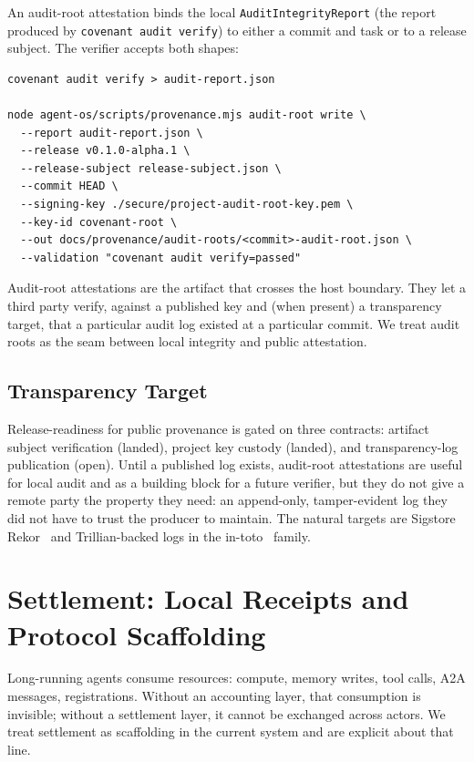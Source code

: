 \documentclass[11pt]{article}
\theoremstyle{plainsmall}
\begin{document}
An audit-root attestation binds the local \texttt{AuditIntegrityReport} (the report produced by \texttt{covenant audit verify}) to either a commit and task or to a release subject. The verifier accepts both shapes:

\begin{lstlisting}
covenant audit verify > audit-report.json

node agent-os/scripts/provenance.mjs audit-root write \
  --report audit-report.json \
  --release v0.1.0-alpha.1 \
  --release-subject release-subject.json \
  --commit HEAD \
  --signing-key ./secure/project-audit-root-key.pem \
  --key-id covenant-root \
  --out docs/provenance/audit-roots/<commit>-audit-root.json \
  --validation "covenant audit verify=passed"
\end{lstlisting}

Audit-root attestations are the artifact that crosses the host boundary. They let a third party verify, against a published key and (when present) a transparency target, that a particular audit log existed at a particular commit. We treat audit roots as the seam between local integrity and public attestation.

\subsection{Transparency Target}

Release-readiness for public provenance is gated on three contracts: artifact subject verification (landed), project key custody (landed), and transparency-log publication (open). Until a published log exists, audit-root attestations are useful for local audit and as a building block for a future verifier, but they do not give a remote party the property they need: an append-only, tamper-evident log they did not have to trust the producer to maintain. The natural targets are Sigstore Rekor~\cite{sigstore} and Trillian-backed logs in the in-toto~\cite{intoto} family.

\section{Settlement: Local Receipts and Protocol Scaffolding}
\label{sec:settle}

Long-running agents consume resources: compute, memory writes, tool calls, A2A messages, registrations. Without an accounting layer, that consumption is invisible; without a settlement layer, it cannot be exchanged across actors. We treat settlement as scaffolding in the current system and are explicit about that line.
\end{document}
